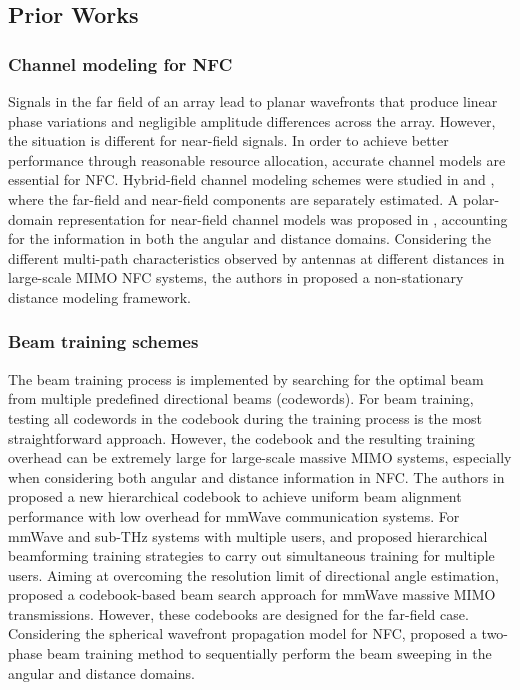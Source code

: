 \documentclass[lettersize, journal]{IEEEtran}
\begin{document}
\subsection{Prior Works}

\subsubsection{Channel modeling for NFC} 

Signals in the far field of an array lead to planar wavefronts that produce linear phase variations and negligible amplitude differences across the array. However, the situation is different for near-field signals.
In order to achieve better performance through reasonable resource allocation, accurate channel models are essential for NFC.
Hybrid-field channel modeling schemes were studied in {\cite{LCOMM2021_ChannelEstimation}} and {\cite{LCOMM2022_HybridField}}, where the far-field and near-field components are separately estimated. 
A polar-domain representation for near-field channel models was proposed in {\cite{TCOMM2022_ChannelEstimation}}, accounting for the information in both the angular and distance domains. 
Considering the different multi-path characteristics observed by antennas at different distances in large-scale MIMO NFC systems, the authors in {\cite{TAP.2022.3218759}} proposed a non-stationary distance modeling framework.


\subsubsection{Beam training schemes} 

The beam training process is implemented by searching for the optimal beam from multiple predefined directional beams (codewords).
For beam training, testing all codewords in the codebook during the training process is the most straightforward approach.
However, the codebook and the resulting training overhead can be extremely large for large-scale massive MIMO systems, especially when considering both angular and distance information in NFC. 
The authors in {\cite{TCOMM.2017.2730878}} proposed a new hierarchical codebook to achieve uniform beam alignment performance with low overhead for mmWave communication systems.
For mmWave and sub-THz systems with multiple users, {\cite{JSAC.2017.2720038}} and {\cite{TWC.2020.3019523}} proposed hierarchical beamforming training strategies to carry out simultaneous training for multiple users. 
Aiming at overcoming the resolution limit of directional angle estimation, {\cite{LWC.2022.3193877}} proposed a codebook-based beam search approach for mmWave massive MIMO transmissions.
However, these codebooks are designed for the far-field case.
Considering the spherical wavefront propagation model for NFC, {\cite{LWC.2022.3212344, TwoStage}} proposed a two-phase beam training method to sequentially perform the beam sweeping in the angular and distance domains.
\end{document}
